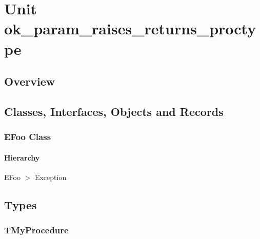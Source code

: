 \documentclass{report}
\newif\ifpdf
\begin{document}
\label{toc}\tableofcontents
\newpage
\newlength{\tmplength}
\chapter{Unit ok{\_}param{\_}raises{\_}returns{\_}proctype}
\label{ok_param_raises_returns_proctype}
\section{Overview}
\begin{description}
\item[\texttt{\begin{ttfamily}EFoo\end{ttfamily} Class}]
\end{description}
\section{Classes, Interfaces, Objects and Records}
\ifpdf
\subsection*{\large{\textbf{EFoo Class}}\normalsize\hspace{1ex}\hrulefill}
\else
\subsection*{EFoo Class}
\fi
\label{ok_param_raises_returns_proctype.EFoo}
\subsubsection*{\large{\textbf{Hierarchy}}\normalsize\hspace{1ex}\hfill}
EFoo {$>$} Exception
\section{Types}
\ifpdf
\subsection*{\large{\textbf{TMyProcedure}}\normalsize\hspace{1ex}\hrulefill}
\else
\end{document}
